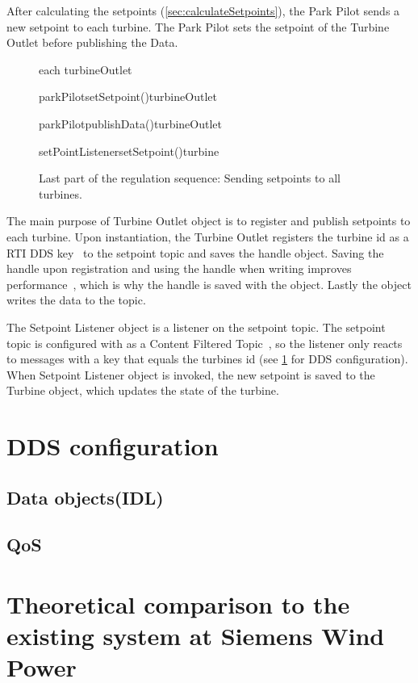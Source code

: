 After calculating the setpoints (\cref{sec:calculateSetpoints}), the Park Pilot sends a new setpoint to each turbine. The Park Pilot sets the setpoint of the Turbine Outlet before publishing the Data.

\begin{figure}
	\centering
	\begin{sequencediagram} %
	
		\begin{sdblock}{each turbineOutlet}{}
			\begin {call}{parkPilot}{setSetpoint()}{turbineOutlet}{}
			\end {call}
			\begin {call}{parkPilot}{publishData()}{turbineOutlet}{}
				\begin {call}{setPointListener}{setSetpoint()}{turbine}{}
				\end {call}
			\end {call}
		\end{sdblock}				
	\end{sequencediagram}

	\caption[Last part of the regulation cycle]{
		\label{fig:sendSetpoints} 
		\footnotesize{%
			Last part of the regulation sequence: Sending setpoints to all turbines.
		}
	}
\end{figure}

The main purpose of Turbine Outlet object is to register and publish setpoints to each turbine. Upon instantiation, the Turbine Outlet registers the turbine id as a RTI DDS key~\cite{rtiConnextUsersManual} to the setpoint topic and saves the handle object. Saving the handle upon registration and using the handle when writing improves performance~\cite{DDSInstanceHandlet}, which is why the handle is saved with the object. Lastly the object writes the data to the topic.

The Setpoint Listener object is a listener on the setpoint topic. The setpoint topic is configured with as a Content Filtered Topic~\cite{rtiConnextUsersManual}, so the listener only reacts to messages with a key that equals the turbines id (see \cref{sec:ddsConfigCen} for DDS configuration). When Setpoint Listener object is invoked, the new setpoint is saved to the Turbine object, which updates the state of the turbine.

\section{DDS configuration}\label{sec:ddsConfigCen} 

\subsection{Data objects(IDL)}

\subsection{QoS}


\section{Theoretical comparison to the existing system at Siemens Wind Power}
